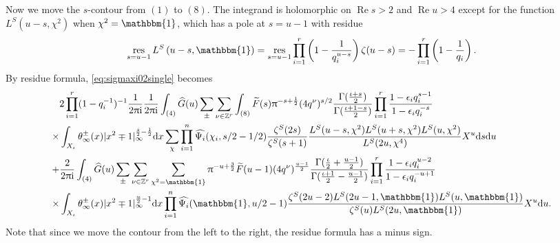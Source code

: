\documentclass[10pt,oneside,reqno]{amsart}
\makeatletter
\newcommand\rmd{\mathrm{d}}
\newcommand\rmi{\mathrm{i}}
\newcommand\ZZ{\mathbb{Z}}
\newcommand\triv{\mathbbm{1}}
\newcommand\dpii{2\uppi\rmi}
\renewcommand\Re{\mathop{\mathrm{Re}}}
\DeclareMathOperator\res{res}
\theoremstyle{THEOREM}
\theoremstyle{DEFINITION}
\theoremstyle{EXERCISE}
\numberwithin{equation}{section}
\renewenvironment{proof}[1][\proofname]{\par
  \vspace{-6pt}
  \pushQED{\qed}
  \normalfont \topsep6\p@\@plus6\p@\relax
  \trivlist
  \item[\hskip\labelsep\rmfamily\bfseries
    #1\@addpunct{:}]\ignorespaces
}{
  \popQED\endtrivlist\@endpefalse
  \vspace{-6pt}
}
\makeatother
\begin{document}
\begin{proof}
Now we move the $s$-contour from $(1)$ to $(8)$. The integrand is holomorphic on $\Re s>2$ and $\Re u>4$ except for the function $L^S(u-s,\chi^2)$ when $\chi^2=\triv$, which has a pole at $s=u-1$ with residue
\[
\res_{s=u-1}L^S\left(u-s,\triv\right)=\res_{s=u-1}\prod_{i=1}^{r}\left(1-\frac{1}{q_i^{u-s}}\right) \zeta(u-s)=-\prod_{i=1}^{r}\left(1-\frac{1}{q_i}\right).
\]
By residue formula, \eqref{eq:sigmaxi02single} becomes
\begin{align*}
&2\prod_{i=1}^{r}(1-q_i^{-1})^{-1}\frac{1}{\dpii}\frac{1}{\dpii}\int_{(4)}\widehat{G}(u)\sum_{\pm}\sum_{\nu\in \ZZ^r}\int_{(8)}\widetilde{F}(s)\uppi^{-s+\frac12}(4q^\nu)^{s/2} \frac{\Gamma(\frac{\iota+s}{2})}{\Gamma(\frac{\iota+1-s}{2})}\prod_{i=1}^{r}\frac{1-\epsilon_i q_i^{s-1}}{1-\epsilon_iq_i^{-s}} \\
  \times&\int_{X_\iota}\theta_\infty^\pm(x)|x^2\mp 1|_\infty^{\frac s2-\frac12}\rmd x\sum_{\chi}\prod_{i=1}^{n}\widehat{\Psi_i}(\chi_i, s/2-1/2)\frac{\zeta^S(2s)}{\zeta^S(s+1)} \frac{L^S(u-s,\chi^2)L^S(u+s,\chi^2)L^S(u,\chi^2)}{L^S(2u,\chi^4)}X^u\rmd s\rmd u\\ 
   +&\frac{2}{\dpii}\int_{(4)}\widehat{G}(u)\sum_{\pm}\sum_{\nu\in \ZZ^r}\sum_{\chi^2=\triv}\uppi^{  -u+\frac32}\widetilde{F}(u-1)(4q^\nu)^{\frac{u-1}{2}} \frac{\Gamma(\frac{\iota}{2}+\frac{u-1}{2})}{\Gamma(\frac{\iota+1}{2}-\frac{u-1}{2})} \prod_{i=1}^{r}\frac{1-\epsilon_i q_i^{u-2}}{1-\epsilon_iq_i^{-u+1}}\\
\times&\int_{X_\iota}\theta_\infty^\pm(x)|x^2\mp 1|_\infty^{\frac u2-1}\rmd x\prod_{i=1}^{n}\widehat{\Psi_i}(\triv,u/2-1)\frac{\zeta^S(2u-2)L^S(2u-1,\triv)L^S(u,\triv)}
{\zeta^S(u)L^S(2u,\triv)}X^u\rmd u.
\end{align*}
Note that since we move the contour from the left to the right, the residue formula has a minus sign.


\end{proof}
\end{document}
